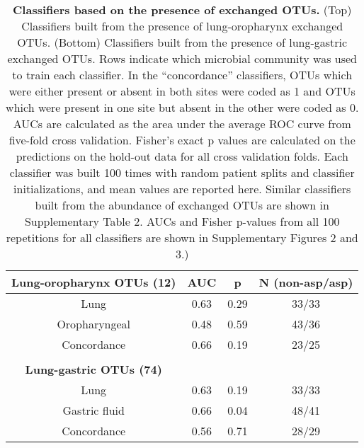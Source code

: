\begin{table}
\begin{center}

\begin{tabular}{cccc}
\textbf{Lung-oropharynx OTUs (12)} & AUC & p & N (non-asp/asp) \\
\toprule
Lung & 0.63 & 0.29 & 33/33 \\
Oropharyngeal & 0.48 & 0.59 & 43/36 \\
Concordance & 0.66 & 0.19 & 23/25 \\
\bottomrule
\\

\textbf{Lung-gastric OTUs (74)} & & & \\
\toprule
Lung & 0.63 & 0.19 & 33/33 \\
Gastric fluid & 0.66 & 0.04 & 48/41 \\
Concordance & 0.56 & 0.71 & 28/29 \\
\bottomrule
\end{tabular}

\caption{\textbf{Classifiers based on the presence of exchanged OTUs.} (Top) Classifiers built from the presence of lung-oropharynx exchanged OTUs. (Bottom) Classifiers built from the presence of lung-gastric exchanged OTUs. Rows indicate which microbial community was used to train each classifier. In the ``concordance'' classifiers, OTUs which were either present or absent in both sites were coded as 1 and OTUs which were present in one site but absent in the other were coded as 0. AUCs are calculated as the area under the average ROC curve from five-fold cross validation. Fisher's exact p values are calculated on the predictions on the hold-out data for all cross validation folds. Each classifier was built 100 times with random patient splits and classifier initializations, and mean values are reported here. Similar classifiers built from the abundance of exchanged OTUs are shown in Supplementary Table 2. AUCs and Fisher p-values from all 100 repetitions for all classifiers are shown in Supplementary Figures 2 and 3.) }\label{tab:exchange-classifiers}
\end{center}
\end{table}

